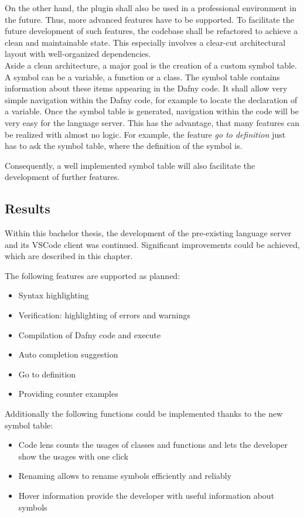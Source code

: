 On the other hand, the plugin shall also be used in a professional environment in the future.
Thus, more advanced features have to be supported.
To facilitate the future development of such features, the codebase shall be refactored to achieve a clean and maintainable state.
This especially involves a clear-cut architectural layout with well-organized dependencies.\\

Aside a clean architecture, a major goal is the creation of a custom symbol table.
A symbol can be a variable, a function or a class.
The symbol table contains information about these items appearing in the Dafny code.
It shall allow very simple navigation within the Dafny code, for example to locate the declaration of a variable.
Once the symbol table is generated, navigation within the code will be very easy for the language server.
This has the advantage, that many features can be realized with almost no logic.
For example, the feature \textit{go to definition} just has to ask the symbol table, where the definition of the symbol is.

Consequently, a well implemented symbol table will also facilitate the development of further features.

\subsection{Results}
Within this bachelor thesis, the development of the pre-existing language server and its VSCode client was continued.
Significant improvements could be achieved, which are described in this chapter.

The following features are supported as planned:
\begin{itemize}
    \item Syntax highlighting
    \item Verification: highlighting of errors and warnings
    \item Compilation of Dafny code and execute
    \item Auto completion suggestion
    \item Go to definition
    \item Providing counter examples
\end{itemize}

Additionally the following functions could be implemented thanks to the new symbol table:
\begin{itemize}
    \item Code lens counts the usages of classes and functions and lets the developer show the usages with one click
    \item Renaming allows to rename symbols efficiently and reliably
    \item Hover information provide the developer with useful information about symbols
\end{itemize}

